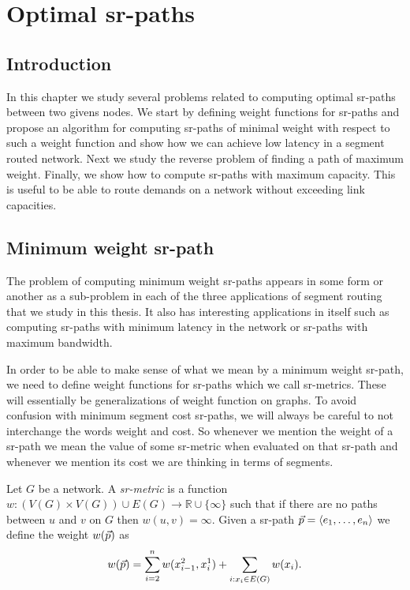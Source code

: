 \chapter{Optimal sr-paths}
\label{chapter:sr-optimal}

\section*{Introduction}

In this chapter we study several problems related to computing optimal sr-paths 
between two givens nodes. We start by defining weight functions for sr-paths and 
propose an algorithm for computing sr-paths of minimal weight with respect to such
a weight function and show how we can achieve low latency in a segment routed network. 
Next we study the reverse problem of finding a path of maximum
weight. Finally, we show how to compute sr-paths with maximum capacity. This is
useful to be able to route demands on a network without exceeding link capacities.

\section{Minimum weight sr-path}

The problem of computing minimum weight sr-paths appears 
in some form or another as a sub-problem in each of the three applications of segment routing
that we study in this thesis. It also has interesting applications in itself such as computing
sr-paths with minimum latency in the network or sr-paths with maximum bandwidth.

In order to be able to make sense of what we mean by a minimum weight sr-path, we need to define
weight functions for sr-paths which we call sr-metrics. These will essentially be generalizations of weight
function on graphs. To avoid confusion with minimum segment cost sr-paths, we will
always be careful to not interchange the words weight and cost. So whenever we mention the weight of a sr-path
we mean the value of some sr-metric when evaluated on that sr-path and whenever we mention its cost we are
thinking in terms of segments.

\begin{definition}
Let $G$ be a network. A \emph{sr-metric} is a function $w : \left( V(G) \times V(G) \right) \cup E(G) \rightarrow \mathbb{R} \cup \{ \infty \}$ such
that if there are no paths between $u$ and $v$ on $G$ then $w(u, v) = \infty$.
Given a sr-path $\vec{p} = \langle e_1, \ldots, e_n \rangle$ we define the weight $w(\vec{p})$ as
$$
w(\vec{p}) = \sum_{i = 2}^n w(x^2_{i - 1}, x^1_i) + \sum_{i : x_i \in E(G)} w(x_i).
$$
\end{definition}

